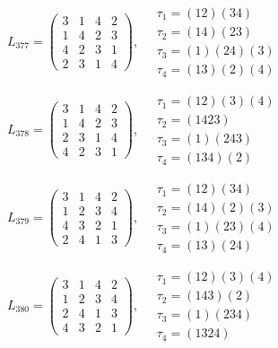 $L_{377} = \begin{pmatrix} 3 & 1 & 4 & 2 \\ 1 & 4 & 2 & 3 \\ 4 & 2 & 3 & 1 \\ 2 & 3 & 1 & 4 \end{pmatrix}, \quad \begin{matrix} \tau_{1} = (1 2)(3 4) \\ \tau_{2} = (1 4)(2 3) \\ \tau_{3} = (1)(2 4)(3) \\ \tau_{4} = (1 3)(2)(4) \end{matrix}$

$L_{378} = \begin{pmatrix} 3 & 1 & 4 & 2 \\ 1 & 4 & 2 & 3 \\ 2 & 3 & 1 & 4 \\ 4 & 2 & 3 & 1 \end{pmatrix}, \quad \begin{matrix} \tau_{1} = (1 2)(3)(4) \\ \tau_{2} = (1 4 2 3) \\ \tau_{3} = (1)(2 4 3) \\ \tau_{4} = (1 3 4)(2) \end{matrix}$

$L_{379} = \begin{pmatrix} 3 & 1 & 4 & 2 \\ 1 & 2 & 3 & 4 \\ 4 & 3 & 2 & 1 \\ 2 & 4 & 1 & 3 \end{pmatrix}, \quad \begin{matrix} \tau_{1} = (1 2)(3 4) \\ \tau_{2} = (1 4)(2)(3) \\ \tau_{3} = (1)(2 3)(4) \\ \tau_{4} = (1 3)(2 4) \end{matrix}$

$L_{380} = \begin{pmatrix} 3 & 1 & 4 & 2 \\ 1 & 2 & 3 & 4 \\ 2 & 4 & 1 & 3 \\ 4 & 3 & 2 & 1 \end{pmatrix}, \quad \begin{matrix} \tau_{1} = (1 2)(3)(4) \\ \tau_{2} = (1 4 3)(2) \\ \tau_{3} = (1)(2 3 4) \\ \tau_{4} = (1 3 2 4) \end{matrix}$

